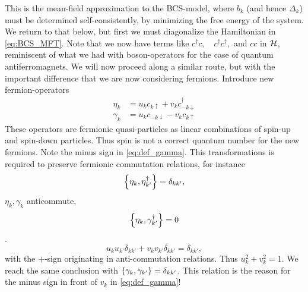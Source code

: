 This is the mean-field approximation to the BCS-model, where $b_k$ (and hence $\Delta_k$) must be determined self-consistently, by minimizing the free energy of the system. We return to that below, but first we must diagonalize the Hamiltonian in \cref{eq:BCS_MFT}. Note that we now have terms like $c^\dagger c, \quad c^\dagger c^\dagger, $ and $cc$ in $\mathcal{H}$, reminiscent of what we had with boson-operators for the case of quantum antiferromagnets. We will now proceed along a similar route, but with the important difference that we are now considering fermions. Introduce new fermion-operators 
\begin{subequations}
	\label{eq:fermion_bogoliubov}
\begin{align}
\label{eq:def_eta} \eta_k &= u_k c_{k\uparrow} + v_k c_{-k\downarrow}^\dagger \\
\label{eq:def_gamma} \gamma_k &=u_kc_{-k\downarrow} - v_k c_{k\uparrow}
\end{align}
\end{subequations}
These operators are fermionic quasi-particles as linear combinations of spin-up and spin-down particles. Thus spin is not a correct quantum number for the new fermions. 
Note the minus sign in \cref{eq:def_gamma}. This transformations is required to preserve fermionic commutation relations, for instance 
\begin{equation}
\label{eq:acomm_eta}
	\acomm{\eta_k}{\eta_{k'}^\dagger} = \delta_{kk'},
\end{equation} $\eta_k, \gamma_k$ anticommute, \[\acomm{\eta_k}{\gamma_{k'}^\dagger} = 0\]. \[u_ku_{k'}\delta_{kk'} + v_kv_{k'}\delta_{kk'} =\delta_{kk'},\]
with the $+$-sign originating in anti-commutation relations. Thus \underline{$u_k^2 + v_k^2 = 1$}. We reach the same conclusion with $\acomm{\gamma_k}{\gamma_{k'}}=\delta_{kk'}$. This relation is the reason for the minus sign in front of $v_k$ in \cref{eq:def_gamma}!

